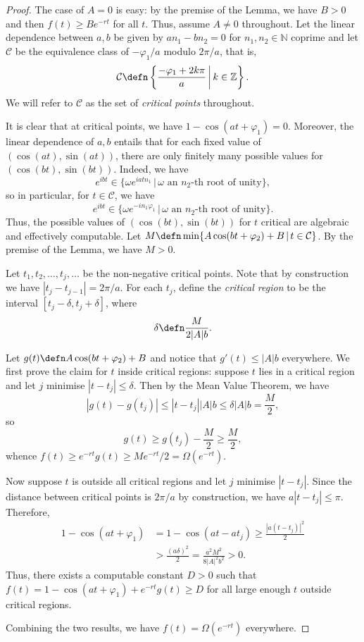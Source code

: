 \begin{proof}
The case of $A=0$ is easy: by the premise of the Lemma, we
have $B>0$ and then $f(t)\geq Be^{-rt}$ for all $t$.
Thus, assume $A\neq 0$ throughout.
Let the linear dependence between $a, b$ be given by $an_1 - bn_2 = 0$
for $n_1,n_2\in\mathbb{N}$ coprime and let
$\mathcal{C}$ be the equivalence class of $-\varphi_1/a$ 
modulo $2\pi/a$, that is,
\[
\mathcal{C} \defn \left\{ \frac{-\varphi_1 + 2k\pi}{a} \, \middle| \, k\in\mathbb{Z} \right\}.
\]
We will refer to $\mathcal{C}$ as the set of \emph{critical points}
throughout. 

It is clear that at critical points, we have $1-\cos(at +
\varphi_1)=0$. Moreover, the linear dependence of $a,b$
entails that for each fixed value of $(\cos(at),\sin(at))$,
there are only finitely many possible values for $(\cos(bt),\sin(bt))$.
Indeed, we have
\[ e^{ibt}\in\{\omega e^{iatn_1} \, | \, \omega\mbox{ an $n_2$-th root of unity} \}, \]
so in particular, for $t\in\mathcal{C}$, we have
\[
e^{ibt}\in\{\omega e^{-in_1\varphi_1}\, |\, \omega\mbox{ an $n_2$-th root of unity} \}.
\]
Thus, the possible values of $(\cos(bt), \sin(bt))$
for $t$ critical are algebraic and effectively computable.
Let $M \defn \min\{ A\cos(bt+\varphi_2)+B\,|\,t\in\mathcal{C}\}$.
By the premise of the Lemma, we have $M>0$.

Let $t_1,t_2,\dots,t_j,\dots$ be the non-negative critical points.
Note that by construction we have $|t_j - t_{j-1}| = 2\pi/a$.
For each $t_j$, define the \emph{critical region} to be the interval
$[t_j-\delta, t_j+\delta]$, where
\[ \delta\defn \frac{M}{2|A|b}. \]

Let $g(t)\defn A\cos(bt+\varphi_2)+B$ and notice that $g'(t)\leq |A|b$
everywhere. We first prove the claim for $t$ inside critical
regions: suppose $t$ lies in a critical region and let $j$ minimise 
$|t-t_j|\leq\delta$. Then by the Mean Value Theorem, we have 
\[ 
|g(t) - g(t_j)| \leq |t-t_j| |A|b \leq \delta|A|b = \frac{M}{2},
\]
so 
\[ g(t)\geq g(t_j) - \frac{M}{2} \geq \frac{M}{2}, \]
whence $f(t) \geq e^{-rt}g(t) \geq Me^{-rt}/2 = \Omega(e^{-rt})$.


Now suppose $t$ is outside all critical regions and let $j$
minimise $|t-t_j|$. Since the distance between critical 
points is $2\pi/a$ by construction, we have $a|t-t_j|\leq \pi$. 
Therefore,
\begin{align*}
1-\cos(at + \varphi_1) & = 1-\cos(at - at_j) \geq 
\frac{|a(t-t_j)|^2}{2} \\
& > \frac{(a\delta)^2}{2} = \frac{a^2M^2}{8|A|^2b^2}>0.
\end{align*}
Thus, there exists a computable constant $D>0$ such that 
$f(t)=1-\cos(at+\varphi_1) + e^{-rt}g(t)\geq D$
for all large enough $t$ outside critical regions.

Combining the two results, we have $f(t) = \Omega(e^{-rt})$
everywhere.
\end{proof}



